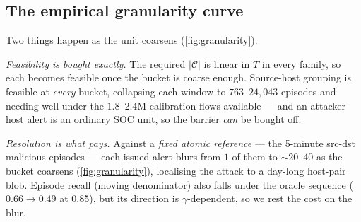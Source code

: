 \documentclass[conference]{IEEEtran}
\newcommand{\Cal}{\mathcal{C}}
\newcommand{\nCal}{\lvert\Cal\rvert}
\begin{document}
\subsection{The empirical granularity curve}

Two things happen as the unit coarsens (\cref{fig:granularity}).

\emph{Feasibility is bought exactly.} The required $\nCal$ is linear in $T$ in every family, so each
becomes feasible once the bucket is coarse enough. Source-host grouping is feasible at \emph{every}
bucket, collapsing each window to $763$--$24{,}043$ episodes and needing well under the
$1.8$--$2.4$M calibration flows available --- and an attacker-host alert is an ordinary SOC unit, so the
barrier \emph{can} be bought off.

\emph{Resolution is what pays.} Against a \emph{fixed atomic reference} --- the 5-minute src-dst
malicious episodes --- each issued alert blurs from $1$ of them to $\sim\!20$--$40$ as the bucket
coarsens (\cref{fig:granularity}), localising the attack to a day-long host-pair blob. Episode recall
(moving denominator) also falls under the oracle sequence ($0.66\to0.49$ at 0.85), but its direction is
$\gamma$-dependent, so we rest the cost on the blur.
\end{document}
